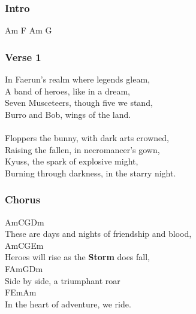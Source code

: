 \documentclass[letterpaper,openany,oneside,twocolumn]{book}
\begin{document}
\clearpage
{}
\newcommand{\chord}[1]{\colorbox{gray!60}{\footnotesize{#1}}}
\subsubsection*{Intro}
\chord{Am} \chord{F} \chord {Am} \chord{G}

\subsubsection*{Verse 1}
{\entryfont In Faerun's realm where legends gleam,}\\
A band of heroes, like in a dream,\\
Seven Musceteers, though five we stand,\\
Burro and Bob, wings of the land.\\
\\
Floppers the bunny, with dark arts crowned,\\
Raising the fallen, in necromancer's gown,\\
Kyuss, the spark of explosive might,\\
Burning through darkness, in the starry night.

\subsubsection*{Chorus}
\hspace*{1.5cm}\chord{Am}\hspace*{0.9cm}\chord{C}\hspace*{1cm}\chord{G}\hspace*{1.8cm}\chord{Dm}\\
{\entryfont These are days and nights of friendship and blood,}\\
\chord{Am}\hspace*{1.1cm}\chord{C}\hspace*{1.3cm}\chord{G}\hspace*{1.3cm}\chord{Em}\\
{\entryfont Heroes will rise as the \textbf{Storm} does fall,}\\
\chord{F}\hspace*{0.85cm}\chord{Am}\hspace*{0.4cm}\chord{G}\hspace*{1.3cm}\chord{Dm}\\
{\entryfont Side by side, a triumphant roar}\\
\hspace*{1.1cm}\chord{F}\hspace*{0.4cm}\chord{Em}\hspace*{1.9cm}\chord{Am}\\
{\entryfont In the heart of adventure, we ride.}
\end{document}
